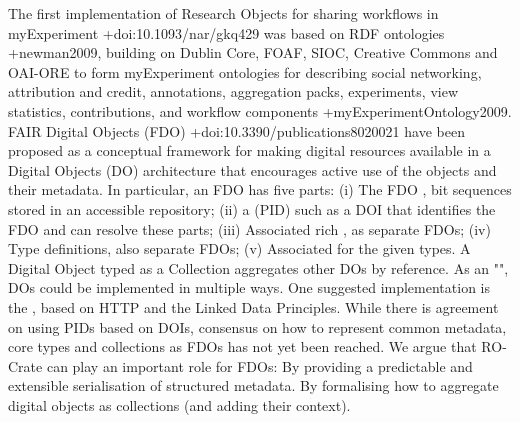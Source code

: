{}The first implementation of Research Objects for sharing workflows in myExperiment +{}{}{doi:10.1093/nar/gkq429} was based on RDF ontologies +{}{}{newman2009}, building on Dublin Core, FOAF, SIOC, Creative Commons and OAI-ORE to form myExperiment ontologies for describing social networking, attribution and credit, annotations, aggregation packs, experiments, view statistics, contributions, and workflow components +{}{}{myExperimentOntology2009}.\markdownRendererInterblockSeparator
{}%
{}\markdownRendererInterblockSeparator
{}FAIR Digital Objects (FDO) +{}{}{doi:10.3390/publications8020021} have been proposed as a conceptual framework for making digital resources available in a Digital Objects (DO) architecture that encourages active use of the objects and their metadata. In particular, an FDO has five parts: (i) The FDO , bit sequences stored in an accessible repository; (ii) a  (PID) such as a DOI that identifies the FDO and can resolve these parts; (iii) Associated rich , as separate FDOs; (iv) Type definitions, also separate FDOs; (v) Associated  for the given types. A Digital Object typed as a Collection aggregates other DOs by reference.\markdownRendererInterblockSeparator
{}As an "", DOs could be implemented in multiple ways. One suggested implementation is the , based on HTTP and the Linked Data Principles. While there is agreement on using PIDs based on DOIs, consensus on how to represent common metadata, core types and collections as FDOs has not yet been reached. We argue that RO-Crate can play an important role for FDOs:\markdownRendererInterblockSeparator
{}\markdownRendererOlBeginTight
{}By providing a predictable and extensible serialisation of structured metadata.\markdownRendererOlItemEnd 
{}By formalising how to aggregate digital objects as collections (and adding their context).\markdownRendererOlItemEnd 
